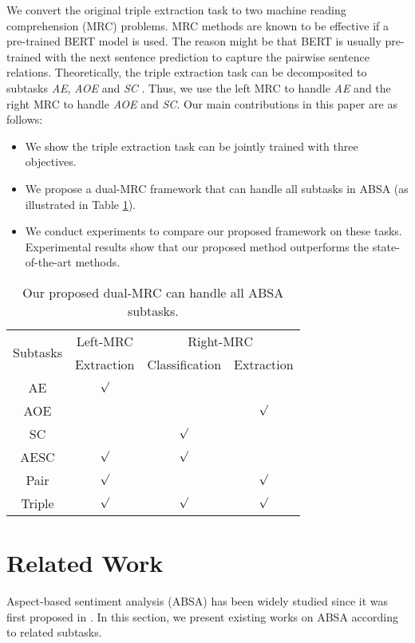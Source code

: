 \documentclass[letterpaper]{article} \usepackage{aaai21}  \usepackage{times}  \usepackage{helvet} \usepackage{courier}  \usepackage[hyphens]{url}  \usepackage{graphicx} \urlstyle{rm} \def\UrlFont{\rm}  \usepackage{natbib}  \usepackage{caption}
\begin{document}
We convert the original triple extraction task to two machine reading comprehension (MRC) problems.
MRC methods are known to be effective if a pre-trained BERT model is used. 
The reason might be that BERT is usually pre-trained with the next sentence prediction to capture the pairwise sentence relations.
Theoretically, the triple extraction task can be decomposited to subtasks \emph{AE}, \emph{AOE} and \emph{SC} .
Thus, we use the left MRC to handle \emph{AE} and the right MRC to handle \emph{AOE} and \emph{SC}. 
Our main contributions in this paper are as follows:
\begin{itemize}
    \item We show the triple extraction task can be jointly trained with three objectives.
    \item We propose a dual-MRC framework that can handle all subtasks in ABSA (as illustrated in Table \ref{subtasks}).
    \item We conduct experiments to compare our proposed framework on these tasks. Experimental results show that our proposed method outperforms the state-of-the-art methods. 
\end{itemize}
\begin{table}
    \centering
    \begin{tabular}{c|c|cc}
    \hline
    \multirow{2}{*}{Subtasks}  & Left-MRC & \multicolumn{2}{c}{Right-MRC}       \\ \cline{2-4} 
           & Extraction  & \multicolumn{1}{c|}{Classification} & Extraction \\ \hline
    AE     &$\surd$    & \multicolumn{1}{c|}{}    &      \\ \hline
    AOE     &      & \multicolumn{1}{c|}{}    &$\surd$    \\ \hline
    SC     &      & \multicolumn{1}{c|}{$\surd$}   &      \\ \hline
    AESC   &$\surd$    & \multicolumn{1}{c|}{$\surd$}    &    \\ \hline
    Pair   &$\surd$    & \multicolumn{1}{c|}{}    &$\surd$    \\ \hline
    Triple &$\surd$    & \multicolumn{1}{c|}{$\surd$}   &$\surd$    \\ \hline
    \end{tabular} 
    \caption{Our proposed dual-MRC can handle all ABSA subtasks.}
    \label{subtasks}
\end{table}




\section{Related Work}
Aspect-based sentiment analysis (ABSA) has been widely studied since it was first proposed in  \cite{kddHuL04}. In this section, we present existing works on ABSA according to related subtasks.
\end{document}
